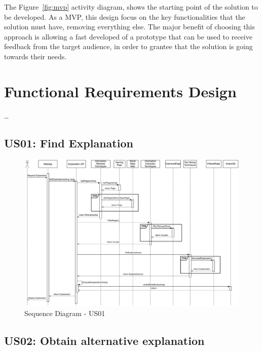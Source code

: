 The Figure~\ref{fig:mvp} activity diagram, shows the starting point of the solution to be developed.
As a \gls{MVP}, this design focus on the key functionalities that the solution must have, removing everything else.
The major benefit of choosing this approach is allowing a fast developed of a prototype that can be used to receive feedback from the target audience, in order to grantee that the solution is going towards their needs.

\section{Functional Requirements Design}

\dots %

\subsection{US01: Find Explanation}

\begin{figure}[H]
\centering
\includegraphics[width=\textwidth,keepaspectratio]{ch4/assets/US01_SD.png}
\caption[Sequence Diagram US01]{Sequence Diagram - US01}
\label{fig:sdus01}
\end{figure}

\subsection{US02: Obtain alternative explanation}

